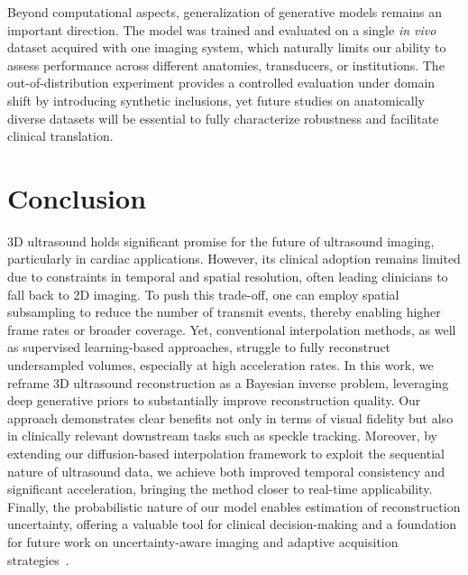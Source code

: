 \documentclass[journal,twoside,web,dvipsnames]{ieeecolor}          %
\begin{document}
Beyond computational aspects, generalization of generative models remains an important direction. The model was trained and evaluated on a single \emph{in vivo} dataset acquired with one imaging system, which naturally limits our ability to assess performance across different anatomies, transducers, or institutions. The out-of-distribution experiment provides a controlled evaluation under domain shift by introducing synthetic inclusions, yet future studies on anatomically diverse datasets will be essential to fully characterize robustness and facilitate clinical translation.

\section{Conclusion}
3D ultrasound holds significant promise for the future of ultrasound imaging, particularly in cardiac applications. However, its clinical adoption remains limited due to constraints in temporal and spatial resolution, often leading clinicians to fall back to 2D imaging. To push this trade-off, one can employ spatial subsampling to reduce the number of transmit events, thereby enabling higher frame rates or broader coverage. Yet, conventional interpolation methods, as well as supervised learning-based approaches, struggle to fully reconstruct undersampled volumes, especially at high acceleration rates. In this work, we reframe 3D ultrasound reconstruction as a Bayesian inverse problem, leveraging deep generative priors to substantially improve reconstruction quality. Our approach demonstrates clear benefits not only in terms of visual fidelity but also in clinically relevant downstream tasks such as speckle tracking. Moreover, by extending our diffusion-based interpolation framework to exploit the sequential nature of ultrasound data, we achieve both improved temporal consistency and significant acceleration, bringing the method closer to real-time applicability. Finally, the probabilistic nature of our model enables estimation of reconstruction uncertainty, offering a valuable tool for clinical decision-making and a foundation for future work on uncertainty-aware imaging and adaptive acquisition strategies~\cite{van2024active}.


\end{document}
